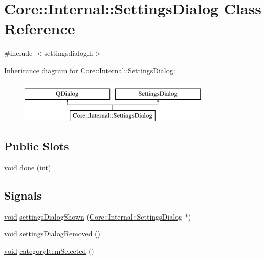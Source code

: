 \hypertarget{class_core_1_1_internal_1_1_settings_dialog}{\section{Core\-:\-:Internal\-:\-:Settings\-Dialog Class Reference}
\label{class_core_1_1_internal_1_1_settings_dialog}
}


{\ttfamily \#include $<$settingsdialog.\-h$>$}

Inheritance diagram for Core\-:\-:Internal\-:\-:Settings\-Dialog\-:\begin{figure}[H]
\begin{center}
\leavevmode
\includegraphics[height=2.000000cm]{class_core_1_1_internal_1_1_settings_dialog}
\end{center}
\end{figure}
\subsection*{Public Slots}
\begin{DoxyCompactItemize}
\item 
\hyperlink{group___u_a_v_objects_plugin_ga444cf2ff3f0ecbe028adce838d373f5c}{void} \hyperlink{group___core_plugin_ga33b9b65180d536d1a0f4f8724ed7af49}{done} (\hyperlink{ioapi_8h_a787fa3cf048117ba7123753c1e74fcd6}{int})
\end{DoxyCompactItemize}
\subsection*{Signals}
\begin{DoxyCompactItemize}
\item 
\hyperlink{group___u_a_v_objects_plugin_ga444cf2ff3f0ecbe028adce838d373f5c}{void} \hyperlink{group___core_plugin_ga8a8645a21b87f0611a5eef4f80c27994}{settings\-Dialog\-Shown} (\hyperlink{class_core_1_1_internal_1_1_settings_dialog}{Core\-::\-Internal\-::\-Settings\-Dialog} $\ast$)
\item 
\hyperlink{group___u_a_v_objects_plugin_ga444cf2ff3f0ecbe028adce838d373f5c}{void} \hyperlink{group___core_plugin_ga5971587cfd354992977a6a7c7ea675ec}{settings\-Dialog\-Removed} ()
\item 
\hyperlink{group___u_a_v_objects_plugin_ga444cf2ff3f0ecbe028adce838d373f5c}{void} \hyperlink{group___core_plugin_ga3134c817d597c2b8915c4648aa70528b}{category\-Item\-Selected} ()
\end{DoxyCompactItemize}
